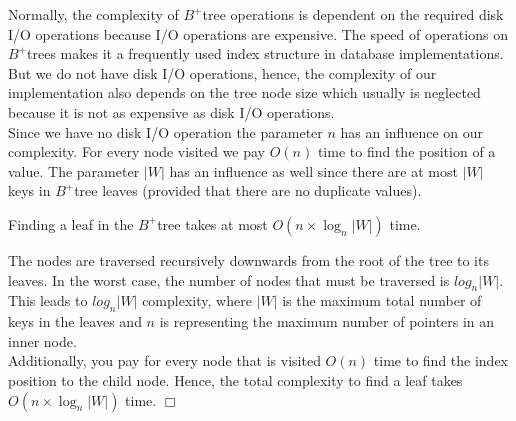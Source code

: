 \documentclass[abstracton,12pt,oneside]{scrreprt}
\newenvironment{proof}
  {\noindent{\bf Proof:\rm}}{\hfill$\Box$\vspace{\medskipamount}}
\begin{document}
Normally, the complexity of $B^+$tree operations is dependent on the 
required disk I/O operations because I/O operations are expensive. The speed of operations on $B^+$trees makes it a frequently used index structure in database implementations. But we do not have disk I/O operations, hence, the complexity of our implementation also depends on the tree node size which usually is neglected because it is not as expensive as disk I/O operations. 
\\Since we have no disk I/O operation the parameter $n$ has an influence on our complexity. For every node visited we pay $O(n)$ time to find the position of a value. The parameter $|W|$ has an influence as well since 
there are at most $|W|$ keys in $B^+$tree leaves (provided that there are no duplicate values).

\begin{mydef}
	Finding a leaf in the $B^+$tree takes at most $O(n \times \log_{n}|W|)$ time.
	\label{def:find}
\end{mydef}
\begin{proof}
 The nodes are traversed recursively downwards from the root of the tree to its leaves.  In the worst case, the number of nodes that must be traversed is $log_{n}|W|$. This leads to $log_{n}|W|$ complexity, where $|W|$ is the maximum total number of keys in the leaves and $n$ is representing the maximum number of pointers in an inner node. \\Additionally, you pay for every node that is visited $O(n)$ time to find the index position to the child node. Hence, the total complexity to find a leaf takes $O(n \times \log_{n}|W|)$ time. 
\end{proof}
\end{document}
